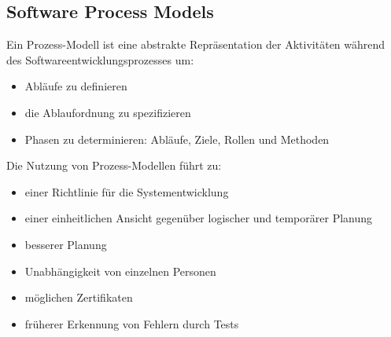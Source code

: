 \subsection{Software Process Models}
Ein Prozess-Modell ist eine abstrakte Repräsentation der Aktivitäten während des Softwareentwicklungsprozesses um:
\begin{itemize}
	\item Abläufe zu definieren
	\item die Ablaufordnung zu spezifizieren
	\item Phasen zu determinieren: Abläufe, Ziele, Rollen und Methoden 
\end{itemize}
Die Nutzung von Prozess-Modellen führt zu:
\begin{itemize}
	\item einer Richtlinie für die Systementwicklung
	\item einer einheitlichen Ansicht gegenüber logischer und temporärer Planung
	\item besserer Planung
	\item Unabhängigkeit von einzelnen Personen
	\item möglichen Zertifikaten
	\item früherer Erkennung von Fehlern durch Tests 
\end{itemize}
